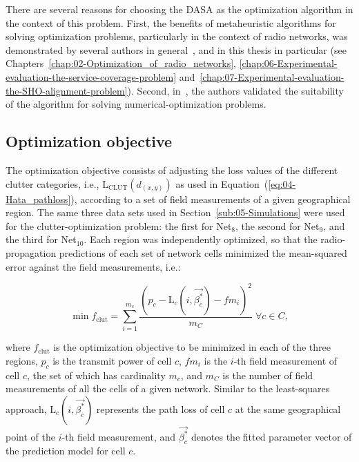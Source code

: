 There are several reasons for choosing the DASA as the optimization
algorithm in the context of this problem. First, the benefits of metaheuristic
algorithms for solving optimization problems, particularly in the
context of radio networks, was demonstrated by several authors in
general~\cite{Benedicic_Balancing_downlink_uplink_soft_handover_areas_in_UMTS_networks:2012,Garcia-Lozano_Metaheuristic_procedure_to_optimize_transmission_delays_in_DVB-T_single_frequency_networks:2011,Huang_Online_propagation_model_correction_based_on_PSO_algorithm_in_LTE_SON_system:2012,Malla_Energy_efficient_resource_allocation_in_OFDMA_networks_using_ant_colony_optimization:2012},
and in this thesis in particular (see Chapters~\ref{chap:02-Optimization_of_radio_networks},
\ref{chap:06-Experimental-evaluation-the-service-coverage-problem}
and~\ref{chap:07-Experimental-evaluation-the-SHO-alignment-problem}).
Second, in~\cite{korosec2010_DASA}, the authors validated the suitability
of the algorithm for solving numerical-optimization problems.


\subsection{Optimization objective \label{sub:Optimization-objective}}

The optimization objective consists of adjusting the loss values of
the different clutter categories, i.e., $\mathrm{L}{}_{\mathrm{CLUT}}(d_{(x,y)})$
as used in Equation~(\ref{eq:04-Hata_pathloss}), according to a
set of field measurements of a given geographical region. The same
three data sets used in Section~\ref{sub:05-Simulations} were used
for the clutter-optimization problem: the first for Net$_{8}$, the
second for Net$_{9}$, and the third for Net$_{10}$. Each region
was independently optimized, so that the radio-propagation predictions
of each set of network cells minimized the mean-squared error against
the field measurements, i.e.:

\begin{equation}
\min f_{\mathrm{clut}}=\sum_{i=1}^{m_{c}}\frac{(p_{c}-\mathrm{L}{}_{c}(i,\vec{\beta_{c}^{*}})-fm_{i})^{2}}{m_{C}}\;\forall c\in C,\label{eq:05-Mean-squared_error}
\end{equation}


\noindent where $f_{\mathrm{clut}}$ is the optimization objective
to be minimized in each of the three regions, $p_{c}$ is the transmit
power of cell $c$, $fm_{i}$ is the $i$-th field measurement of
cell $c$, the set of which has cardinality $m_{c}$, and $m_{C}$
is the number of field measurements of all the cells of a given network.
Similar to the least-squares approach, $\mathrm{L}{}_{c}(i,\vec{\beta_{c}^{*}})$
represents the path loss of cell $c$ at the same geographical point
of the $i$-th field measurement, and $\vec{\beta_{c}^{*}}$ denotes
the fitted parameter vector of the prediction model for cell $c$.

